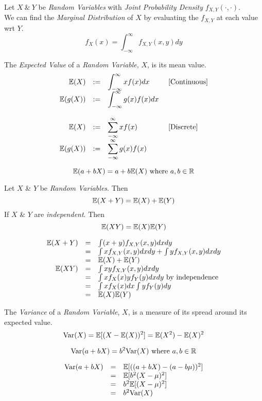 \documentclass[11pt,a4paper]{article}
\begin{document}
Let $X\ \&\ Y$ be \textit{Random Variables} with \textit{Joint Probability Density} $f_{X,Y}(\cdot,\cdot)$.\\
We can find the \textit{Marginal Distribution} of $X$ by evaluating the $f_{X,Y}$ at each value wrt $Y$.
$$f_X(x)=\int_{-\infty}^\infty f_{X,Y}(x,y)dy$$

The \textit{Expected Value} of a \textit{Random Variable}, $X$, is its mean value.
\[\begin{array}{rcll}
\mathbb{E}(X)&:=&\displaystyle\int_{-\infty}^\infty xf(x)dx&\text{ [Continuous]}\\
\mathbb{E}(g(X))&:=&\displaystyle\int_{-\infty}^\infty g(x)f(x)dx&\\\\
\mathbb{E}(X)&:=&\displaystyle\sum_{-\infty}^\infty xf(x)&\text{ [Discrete]}\\
\mathbb{E}(g(X))&:=&\displaystyle\sum_{-\infty}^\infty g(x)f(x)&
\end{array}\]

$$\mathbb{E}(a+bX)=a+b\mathbb{E}(X)\text{ where }a,b\in\mathbb{R}$$

Let $X$ \& $Y$ be \textit{Random Variables}. Then
$$\mathbb{E}(X+Y)=\mathbb{E}(X)+\mathbb{E}(Y)$$
If $X$ \& $Y$ are \textit{independent}. Then
$$\mathbb{E}(XY)=\mathbb{E}(X)\mathbb{E}(Y)$$

\[\begin{array}{rcl}
\mathbb{E}(X+Y)&=&\int(x+y)f_{X,Y}(x,y)dxdy\\
&=&\int xf_{X,Y}(x,y)dxdy+\int yf_{X,Y}(x,y)dxdy\\
&=&\mathbb{E}(X)+\mathbb{E}(Y)\\
\mathbb{E}(XY)&=&\int xyf_{X,Y}(x,y)dxdy\\
&=&\int xf_X(x)yf_Y(y)dxdy\text{ by independence}\\
&=&\int xf_X(x)dx\int yf_Y(y)dy\\
&=&\mathbb{E}(X)\mathbb{E}(Y)
\end{array}\]

The \textit{Variance} of a \textit{Random Variable}, $X$, is a measure of its spread around its expected value.
$$\mathrm{Var}(X)=\mathbb{E}[(X-\mathbb{E}(X))^2]=\mathbb{E}(X^2)-\mathbb{E}(X)^2$$

$$\mathrm{Var}(a+bX)=b^2\mathrm{Var}(X)\text{ where }a,b\in\mathbb{R}$$

\[\begin{array}{rcl}
\mathrm{Var}(a+bX)&=&\mathbb{E}[((a+bX)-(a-b\mu))^2]\\
&=&\mathbb{E}[b^2(X-\mu)^2]\\
&=&b^2\mathbb{E}[(X-\mu)^2]\\
&=&b^2\mathrm{Var}(X)
\end{array}\]
\end{document}
